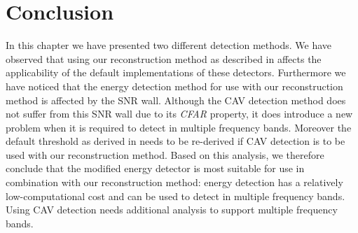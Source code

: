 \documentclass[a4paper, openany, oneside]{memoir}
\begin{document}
\section{Conclusion}
In this chapter we have presented two different detection methods. We have observed that using our reconstruction method as described in  affects the applicability of the default implementations of these detectors.  Furthermore we have noticed that the energy detection method for use with our reconstruction method is affected by the SNR wall. Although the CAV detection method does not suffer from this SNR wall due to its \emph{CFAR} property, it does introduce a new problem when it is required to detect in multiple frequency bands. Moreover the default threshold as derived in \cite{zheng2009spectrum} needs to be re-derived if CAV detection is to be used with our reconstruction method. Based on this analysis, we therefore conclude that the modified energy detector is most suitable for use in combination with our reconstruction method: energy detection has a relatively low-computational cost and can be used to detect in multiple frequency bands.  Using CAV detection needs additional analysis to support multiple frequency bands. 
\end{document}
